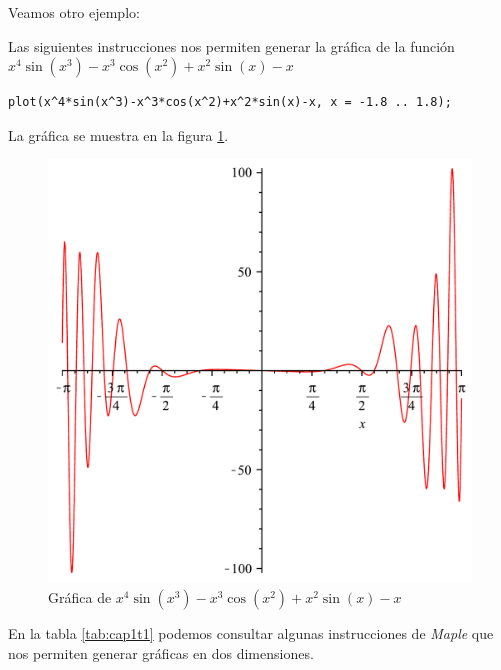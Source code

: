 \documentclass[letterpaper,12pt]{book}
\begin{document}
\pagebreak

Veamos otro ejemplo:

Las siguientes instrucciones nos permiten generar la gráfica de la función 
$\displaystyle {x}^{4}\sin \left( {x}^{3} \right) -{x}^{3}\cos \left( {x}^{2}
 \right) +{x}^{2}\sin \left( x \right) -x$

\begin{verbatim}
plot(x^4*sin(x^3)-x^3*cos(x^2)+x^2*sin(x)-x, x = -1.8 .. 1.8);
\end{verbatim}

La gráfica se muestra en la figura \ref{cap1f2}.

\begin{figure}[h!]
\centering
\includegraphics[scale=0.5]{grafica02.pdf}
\caption{Gráfica de ${x}^{4}\sin \left( {x}^{3} \right) -{x}^{3}\cos \left( {x}^{2}
 \right) +{x}^{2}\sin \left( x \right) -x$}\label{cap1f2}
\end{figure}

En la tabla \ref{tab:cap1t1} podemos consultar algunas instrucciones de \emph{Maple} que nos
permiten generar gráficas en dos dimensiones.
\end{document}
